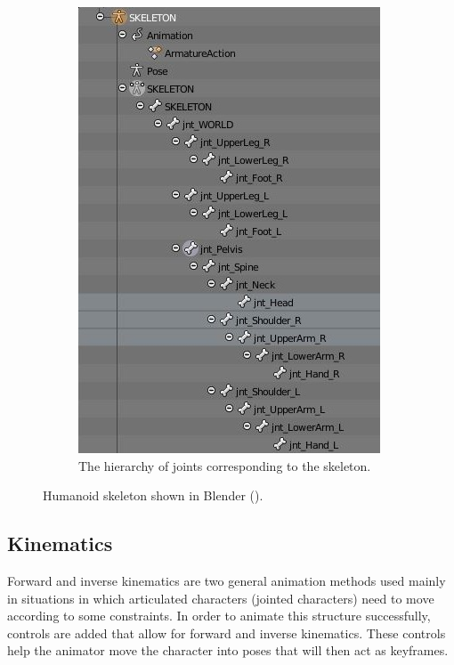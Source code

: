 \begin{figure}[h!]
\begin{subfigure}[b!]{0.4\textwidth}
                \includegraphics[width=\linewidth]{img/skeleton_hierarchy}
                \caption{The hierarchy of joints corresponding to the skeleton.}
                \label{fig:hierarchy}
        \end{subfigure}%
	\caption{Humanoid skeleton shown in Blender (\citep{blender}).}
	\label{fig:rig}
\end{figure}

\subsection{Kinematics}
Forward and inverse kinematics are two general animation methods used mainly in situations in which  articulated characters (jointed characters) need to move according to some constraints. In order to animate this structure successfully, controls are added that allow for forward and inverse kinematics. These controls help the animator move the character into poses that will then act as keyframes.

